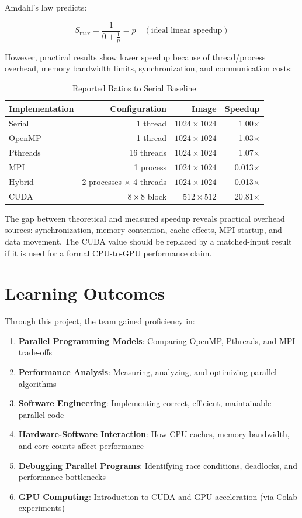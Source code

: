 \documentclass[12pt,a4paper]{report}
\begin{document}
Amdahl's law predicts:

\begin{equation}
S_{\max} = \frac{1}{0 + \frac{1}{p}} = p \quad (\text{ideal linear speedup})
\end{equation}

However, practical results show lower speedup because of thread/process overhead, memory bandwidth limits, synchronization, and communication costs:

\begin{table}[H]
    \centering
    \footnotesize
    \begin{tabular}{|l|r|r|r|}
    \hline
    \textbf{Implementation} & \textbf{Configuration} & \textbf{Image} & \textbf{Speedup} \\
    \hline
    Serial & 1 thread & $1024 \times 1024$ & 1.00$\times$ \\
    OpenMP & 1 thread & $1024 \times 1024$ & 1.03$\times$ \\
    Pthreads & 16 threads & $1024 \times 1024$ & 1.07$\times$ \\
    MPI & 1 process & $1024 \times 1024$ & 0.013$\times$ \\
    Hybrid & 2 processes $\times$ 4 threads & $1024 \times 1024$ & 0.013$\times$ \\
    CUDA & $8 \times 8$ block & $512 \times 512$ & 20.81$\times$ \\
    \hline
    \end{tabular}
    \caption{Reported Ratios to Serial Baseline}
\end{table}

The gap between theoretical and measured speedup reveals practical overhead sources: synchronization, memory contention, cache effects, MPI startup, and data movement. The CUDA value should be replaced by a matched-input result if it is used for a formal CPU-to-GPU performance claim.

\section{Learning Outcomes}

Through this project, the team gained proficiency in:

\begin{enumerate}
    \item \textbf{Parallel Programming Models}: Comparing OpenMP, Pthreads, and MPI trade-offs
    \item \textbf{Performance Analysis}: Measuring, analyzing, and optimizing parallel algorithms
    \item \textbf{Software Engineering}: Implementing correct, efficient, maintainable parallel code
    \item \textbf{Hardware-Software Interaction}: How CPU caches, memory bandwidth, and core counts affect performance
    \item \textbf{Debugging Parallel Programs}: Identifying race conditions, deadlocks, and performance bottlenecks
    \item \textbf{GPU Computing}: Introduction to CUDA and GPU acceleration (via Colab experiments)
\end{enumerate}
\end{document}
